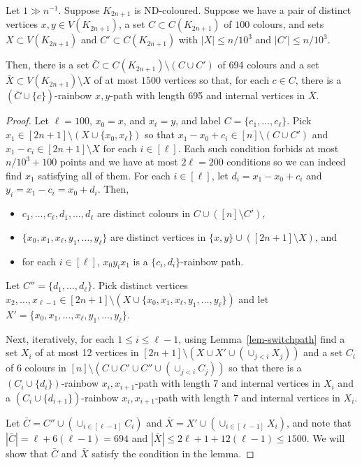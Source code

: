 \begin{lemma}\label{lem-absorbpath}
Let $1\gg n^{-1}$. Suppose $K_{2n+1}$ is ND-coloured.
Suppose we have a pair of distinct vertices $x,y\in V(K_{2n+1})$, a set $C\subset C(K_{2n+1})$ of $100$ colours, and sets $X\subset V(K_{2n+1})$ and $C'\subset C(K_{2n+1})$ with $|X|\leq n/10^3$ and $|C'|\leq n/10^3$.

Then, there is a set $\bar{C}\subset C(K_{2n+1})\setminus (C\cup C')$ of 694 colours and a set $\bar{X}\subset V(K_{2n+1})\setminus X$ of at most $1500$ vertices so that, for each $c\in C$,
there is a $(\bar{C}\cup \{c\})$-rainbow $x,y$-path with length 695 and internal vertices in $\bar{X}$.
\end{lemma}
\begin{proof}
Let $\ell=100$, $x_0=x$, and $x_\ell=y$, and label $C=\{c_1,\ldots,c_\ell\}$. Pick $x_1\in [2n+1]\setminus (X\cup\{x_0,x_\ell\})$ so that $x_1-x_0+c_i\in [n]\setminus (C\cup C')$ and $x_1-c_i\in [2n+1]\setminus X$
for each $i\in [\ell]$. Each such condition forbids at most $n/10^3+100$ points and we have at most $2\ell=200$ conditions so we can indeed find $x_1$ satisfying all of them.
For each $i\in [\ell]$, let $d_i=x_1-x_0+c_i$ and $y_i= x_1-c_i=x_0+d_i$. Then,
\begin{itemize}
\item $c_1,\ldots,c_\ell,d_1,\ldots,d_\ell$ are distinct colours in $C\cup ([n]\setminus C')$,
\item $\{x_0,x_1,x_\ell,y_1,\ldots,y_\ell\}$ are distinct vertices in $\{x,y\}\cup ([2n+1]\setminus X)$, and
\item for each $i\in [\ell]$, $x_0y_ix_1$ is a $\{c_i,d_i\}$-rainbow path.
\end{itemize}
Let $C''=\{d_1,\ldots,d_\ell\}$.
Pick distinct vertices $x_2,\ldots,x_{\ell-1}\in [2n+1]\setminus (X\cup\{x_0,x_1,x_\ell,y_1,\ldots,y_\ell\})$ and let $X'=\{x_0,x_1,\ldots,x_\ell,y_1,\ldots,y_\ell\}$.

Next, iteratively, for each $1\leq i\leq \ell-1$, using Lemma~\ref{lem-switchpath} find a set $X_i$ of at most 12 vertices in $[2n+1]\setminus (X\cup X'\cup(\cup_{j<i}X_j))$ and a set $C_i$ of 6 colours in $[n]\setminus (C\cup C'\cup C''\cup(\cup_{j<i}C_j))$ so that there is a $(C_i\cup\{d_{i}\})$-rainbow $x_i,x_{i+1}$-path with length 7 and internal vertices in $X_i$ and a $(C_i\cup\{d_{i+1}\})$-rainbow
 $x_i,x_{i+1}$-path with length 7 and internal vertices in $X_i$.

Let $\bar{C}=C''\cup(\cup_{i\in [\ell-1]}C_i)$ and $\bar{X}=X'\cup (\cup_{i\in [\ell-1]}X_i)$, and note that $|\bar{C}|=\ell+6(\ell-1)=694$ and 
$|\bar{X}|\leq 2\ell+1+12(\ell-1) \leq 1500$. We will show that $\bar{C}$ and $\bar{X}$ satisfy the condition in the lemma.


\end{proof}
